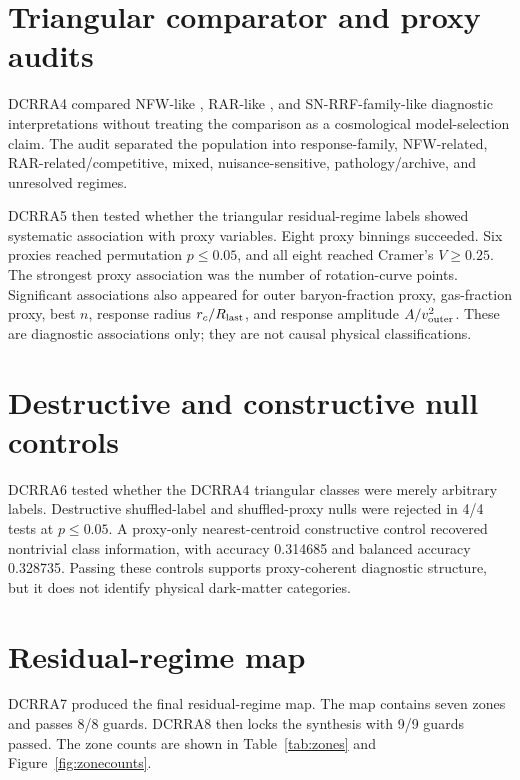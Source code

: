 \documentclass[11pt,a4paper]{article}
\begin{document}
\section{Triangular comparator and proxy audits}
DCRRA4 compared NFW-like \cite{nfw1997}, RAR-like \cite{mcgaugh2016}, and SN-RRF-family-like \cite{yoshimura2026snrrf} diagnostic interpretations without treating the comparison as a cosmological model-selection claim. The audit separated the population into response-family, NFW-related, RAR-related/competitive, mixed, nuisance-sensitive, pathology/archive, and unresolved regimes.

DCRRA5 then tested whether the triangular residual-regime labels showed systematic association with proxy variables. Eight proxy binnings succeeded. Six proxies reached permutation $p\leq 0.05$, and all eight reached Cramer's $V \geq 0.25$. The strongest proxy association was the number of rotation-curve points. Significant associations also appeared for outer baryon-fraction proxy, gas-fraction proxy, best $n$, response radius $r_c/R_{\rm last}$, and response amplitude $A/v_{\rm outer}^2$. These are diagnostic associations only; they are not causal physical classifications.

\section{Destructive and constructive null controls}
DCRRA6 tested whether the DCRRA4 triangular classes were merely arbitrary labels. Destructive shuffled-label and shuffled-proxy nulls were rejected in 4/4 tests at $p\leq 0.05$. A proxy-only nearest-centroid constructive control recovered nontrivial class information, with accuracy 0.314685 and balanced accuracy 0.328735. Passing these controls supports proxy-coherent diagnostic structure, but it does not identify physical dark-matter categories.

\section{Residual-regime map}
DCRRA7 produced the final residual-regime map. The map contains seven zones and passes 8/8 guards. DCRRA8 then locks the synthesis with 9/9 guards passed. The zone counts are shown in Table~\ref{tab:zones} and Figure~\ref{fig:zonecounts}.
\end{document}

